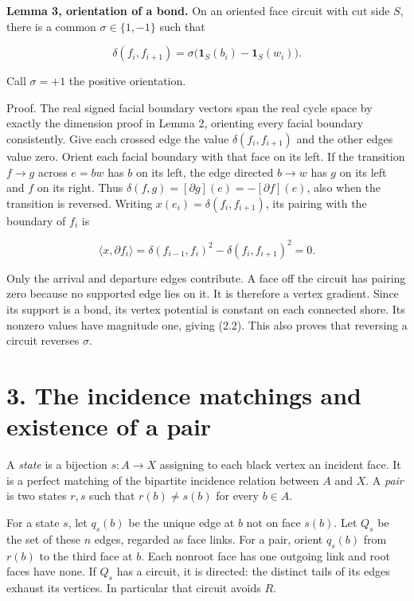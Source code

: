 \documentclass[a4paper,11pt]{amsart}
\begin{document}
\textbf{Lemma 3, orientation of a bond.} On an oriented face circuit with cut side $S$, there is a common $\sigma\in\{1,\allowbreak -1\}$ such that

\begin{equation*}
\delta(f_i,f_{i+1})=\sigma\bigl(\mathbf1_S(b_i)-\mathbf1_S(w_i)\bigr).       \tag{2.2}
\end{equation*}

Call $\sigma=+1$ the positive orientation.

Proof. The real signed facial boundary vectors span the real cycle space by exactly the dimension proof in Lemma 2, orienting every facial boundary consistently. Give each crossed edge the value $\delta(f_i,\allowbreak f_{i+1})$ and the other edges value zero. Orient each facial boundary with that face on its left. If the transition $f\to g$ across $e=bw$ has $b$ on its left, the edge directed $b\to w$ has $g$ on its left and $f$ on its right. Thus $\delta(f,\allowbreak g)=[\partial g](e)=-[\partial f](e)$, also when the transition is reversed. Writing $x(e_i)=\delta(f_i,\allowbreak f_{i+1})$, its pairing with the boundary of $f_i$ is

\begin{equation*}
\langle x,\partial f_i\rangle
=\delta(f_{i-1},f_i)^2-\delta(f_i,f_{i+1})^2=0.
\end{equation*}

Only the arrival and departure edges contribute. A face off the circuit has pairing zero because no supported edge lies on it. It is therefore a vertex gradient. Since its support is a bond, its vertex potential is constant on each connected shore. Its nonzero values have magnitude one, giving (2.2). This also proves that reversing a circuit reverses $\sigma$.

\section*{3. The incidence matchings and existence of a pair}

A \emph{state} is a bijection $s:A\to X$ assigning to each black vertex an incident face. It is a perfect matching of the bipartite incidence relation between $A$ and $X$. A \emph{pair} is two states $r,\allowbreak s$ such that $r(b)\ne s(b)$ for every $b\in A$.

For a state $s$, let $q_s(b)$ be the unique edge at $b$ not on face $s(b)$. Let $Q_s$ be the set of these $n$ edges, regarded as face links. For a pair, orient $q_s(b)$ from $r(b)$ to the third face at $b$. Each nonroot face has one outgoing link and root faces have none. If $Q_s$ has a circuit, it is directed: the distinct tails of its edges exhaust its vertices. In particular that circuit avoids $R$.
\end{document}
